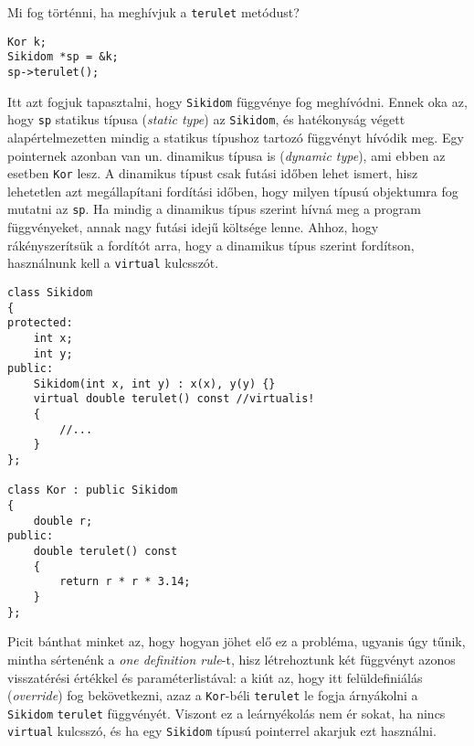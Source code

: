 \documentclass[a4paper,11.5pt]{article}
\begin{document}
	Mi fog történni, ha meghívjuk a \texttt{terulet} metódust?
	\begin{lstlisting}
Kor k;
Sikidom *sp = &k;
sp->terulet();
	\end{lstlisting}
	Itt azt fogjuk tapasztalni, hogy \texttt{Sikidom} függvénye fog meghívódni. Ennek oka az, hogy \texttt{sp} statikus típusa (\textit{static type}) az \texttt{Sikidom}, és hatékonyság végett alapértelmezetten mindig a statikus típushoz tartozó függvényt hívódik meg. Egy pointernek azonban van un. dinamikus típusa is (\textit{dynamic type}), ami ebben az esetben \texttt{Kor} lesz. A dinamikus típust csak futási időben lehet ismert, hisz lehetetlen azt megállapítani fordítási időben, hogy milyen típusú objektumra fog mutatni az \texttt{sp}. Ha mindig a dinamikus típus szerint hívná meg a program függvényeket, annak nagy futási idejű költsége lenne. Ahhoz, hogy rákényszerítsük a fordítót arra, hogy a dinamikus típus szerint fordítson, használnunk kell a \texttt{virtual} kulcsszót.
\begin{lstlisting}
class Sikidom
{
protected:
	int x;
	int y;
public:
	Sikidom(int x, int y) : x(x), y(y) {}
	virtual double terulet() const //virtualis!
	{
		//...
	}
};

class Kor : public Sikidom
{
	double r;
public:
	double terulet() const
	{
		return r * r * 3.14;
	}
};
\end{lstlisting}
	Picit bánthat minket az, hogy hogyan jöhet elő ez a probléma, ugyanis úgy tűnik, mintha sértenénk a \textit{one definition rule}-t, hisz létrehoztunk két függvényt azonos visszatérési értékkel és paraméterlistával: a kiút az, hogy itt felüldefiniálás (\textit{override}) fog bekövetkezni, azaz a \texttt{Kor}-béli \texttt{terulet} le fogja árnyákolni a \texttt{Sikidom} \texttt{terulet} függvényét. Viszont ez a leárnyékolás nem ér sokat, ha nincs \texttt{virtual} kulcsszó, és ha egy \texttt{Sikidom} típusú pointerrel akarjuk ezt használni.
%
%
\end{document}
